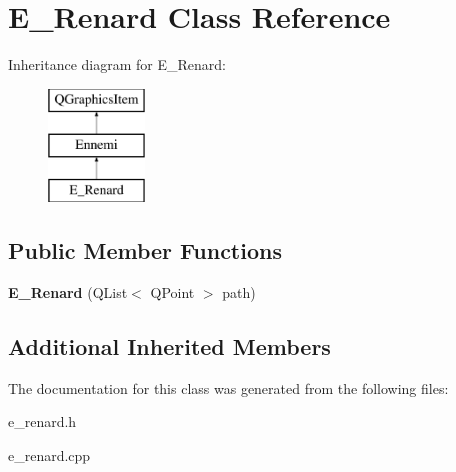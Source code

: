 \hypertarget{class_e___renard}{}\section{E\+\_\+\+Renard Class Reference}
\label{class_e___renard}
Inheritance diagram for E\+\_\+\+Renard\+:\begin{figure}[H]
\begin{center}
\leavevmode
\includegraphics[height=3.000000cm]{class_e___renard}
\end{center}
\end{figure}
\subsection*{Public Member Functions}
\begin{DoxyCompactItemize}
\item 
\hypertarget{class_e___renard_a1cd896de8a46532ab855854b3366e426}{}{\bfseries E\+\_\+\+Renard} (Q\+List$<$ Q\+Point $>$ path)\label{class_e___renard_a1cd896de8a46532ab855854b3366e426}

\end{DoxyCompactItemize}
\subsection*{Additional Inherited Members}


The documentation for this class was generated from the following files\+:\begin{DoxyCompactItemize}
\item 
e\+\_\+renard.\+h\item 
e\+\_\+renard.\+cpp\end{DoxyCompactItemize}
